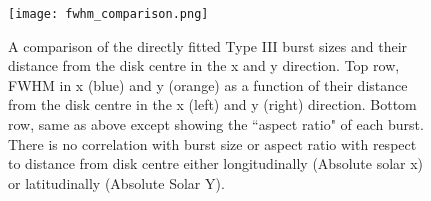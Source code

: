 
\begin{figure}[ht]
\centering
\texttt{[image: fwhm\_comparison.png]}
\caption[Directly fitted Type III burst sizes as a function of position relative to disk centre.]{A comparison of the directly fitted Type III burst sizes and their distance from the disk centre in the x and y direction. Top row, FWHM in x (blue) and y (orange) as a function of their distance from the disk centre in the x (left) and y (right) direction. Bottom row, same as above except showing the ``aspect ratio" of each burst. There is no correlation with burst size or aspect ratio with respect to distance from disk centre either longitudinally (Absolute solar x) or latitudinally (Absolute Solar Y).}
\label{fig:fwhm_comp}
\end{figure}

